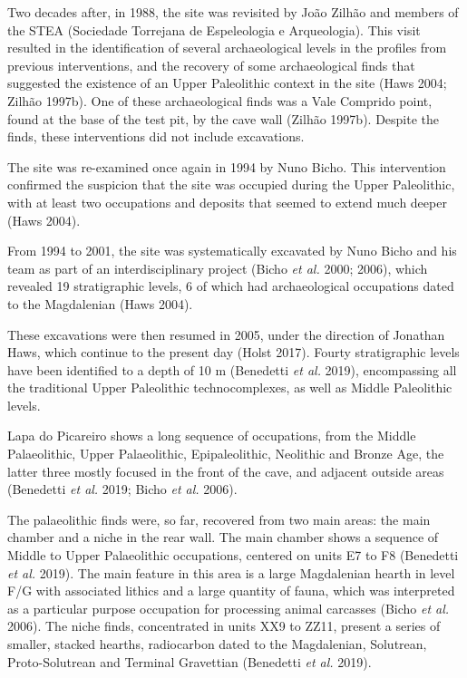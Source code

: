 \documentclass[12pt,twoside]{reedthesis}
\begin{document}
Two decades after, in 1988, the site was revisited by João Zilhão and members of the STEA (Sociedade Torrejana de Espeleologia e Arqueologia). This visit resulted in the identification of several archaeological levels in the profiles from previous interventions, and the recovery of some archaeological finds that suggested the existence of an Upper Paleolithic context in the site (Haws 2004; Zilhão 1997b). One of these archaeological finds was a Vale Comprido point, found at the base of the test pit, by the cave wall (Zilhão 1997b). Despite the finds, these interventions did not include excavations.

The site was re-examined once again in 1994 by Nuno Bicho. This intervention confirmed the suspicion that the site was occupied during the Upper Paleolithic, with at least two occupations and deposits that seemed to extend much deeper (Haws 2004).

From 1994 to 2001, the site was systematically excavated by Nuno Bicho and his team as part of an interdisciplinary project (Bicho \emph{et al.} 2000; 2006), which revealed 19 stratigraphic levels, 6 of which had archaeological occupations dated to the Magdalenian (Haws 2004).

These excavations were then resumed in 2005, under the direction of Jonathan Haws, which continue to the present day (Holst 2017). Fourty stratigraphic levels have been identified to a depth of 10 m (Benedetti \emph{et al.} 2019), encompassing all the traditional Upper Paleolithic technocomplexes, as well as Middle Paleolithic levels.

Lapa do Picareiro shows a long sequence of occupations, from the Middle Palaeolithic, Upper Palaeolithic, Epipaleolithic, Neolithic and Bronze Age, the latter three mostly focused in the front of the cave, and adjacent outside areas (Benedetti \emph{et al.} 2019; Bicho \emph{et al.} 2006).

The palaeolithic finds were, so far, recovered from two main areas: the main chamber and a niche in the rear wall. The main chamber shows a sequence of Middle to Upper Palaeolithic occupations, centered on units E7 to F8 (Benedetti \emph{et al.} 2019). The main feature in this area is a large Magdalenian hearth in level F/G with associated lithics and a large quantity of fauna, which was interpreted as a particular purpose occupation for processing animal carcasses (Bicho \emph{et al.} 2006). The niche finds, concentrated in units XX9 to ZZ11, present a series of smaller, stacked hearths, radiocarbon dated to the Magdalenian, Solutrean, Proto-Solutrean and Terminal Gravettian (Benedetti \emph{et al.} 2019).
\end{document}
